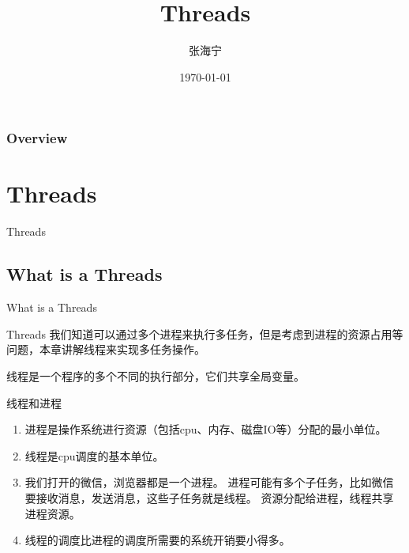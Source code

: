 \documentclass{beamer}
\title[Threads]{Threads} %
\author{张海宁} %
\institute[计算机科学与技术学院] %
{
贵州大学 \\ %
\medskip
\textit{hnzhang1@gzu.edu.cn} %
}
\date{\today} %
\begin{document}
\begin{frame}
\titlepage %
\end{frame}

\begin{frame}
\frametitle{Overview} %
\tableofcontents %
\end{frame}

\section{Threads}
\begin{frame}
\Huge{\centerline{Threads}}
\end{frame}
\subsection{What is a Threads}
\begin{frame}
\Huge{\centerline{What is a Threads}}
\end{frame}
\begin{frame}{Threads}
我们知道可以通过多个进程来执行多任务，但是考虑到进程的资源占用等问题，本章讲解线程来实现多任务操作。

线程是一个程序的多个不同的执行部分，它们共享全局变量。

\end{frame}
\begin{frame}{线程和进程}
\begin{enumerate}
\item
进程是操作系统进行资源（包括cpu、内存、磁盘IO等）分配的最小单位。
\item
线程是cpu调度的基本单位。
\item
我们打开的微信，浏览器都是一个进程。
进程可能有多个子任务，比如微信要接收消息，发送消息，这些子任务就是线程。
资源分配给进程，线程共享进程资源。
\item
线程的调度比进程的调度所需要的系统开销要小得多。
\end{enumerate}
\end{frame}
\end{document}
